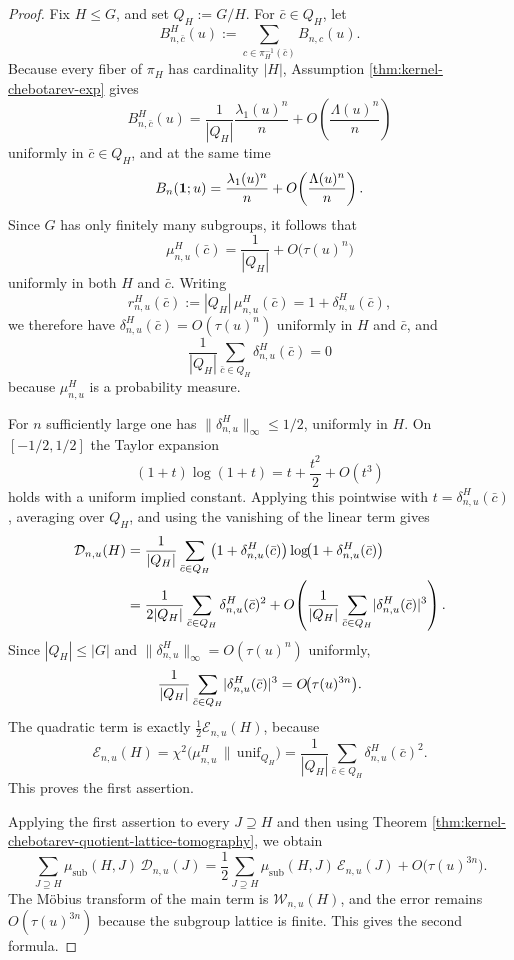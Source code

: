 \begin{proof}
Fix \(H\le G\), and set \(Q_H:=G/H\). For \(\bar c\in Q_H\), let
\[
B^{H}_{n,\bar c}(u):=\sum_{c\in \pi_H^{-1}(\bar c)}B_{n,c}(u).
\]
Because every fiber of \(\pi_H\) has cardinality \(|H|\), Assumption \ref{thm:kernel-chebotarev-exp} gives
\[
B^{H}_{n,\bar c}(u)
=
\frac{1}{|Q_H|}\frac{\lambda_1(u)^n}{n}
+
O\!\left(\frac{\Lambda(u)^n}{n}\right)
\]
uniformly in \(\bar c\in Q_H\), and at the same time
\[
B_n(\mathbf{1};u)
=
\frac{\lambda_1(u)^n}{n}
+
O\!\left(\frac{\Lambda(u)^n}{n}\right).
\]
Since \(G\) has only finitely many subgroups, it follows that
\[
\mu_{n,u}^H(\bar c)=\frac{1}{|Q_H|}+O\!\bigl(\tau(u)^n\bigr)
\]
uniformly in both \(H\) and \(\bar c\). Writing
\[
r_{n,u}^H(\bar c):=|Q_H|\,\mu_{n,u}^H(\bar c)=1+\delta_{n,u}^H(\bar c),
\]
we therefore have \(\delta_{n,u}^H(\bar c)=O(\tau(u)^n)\) uniformly in \(H\) and \(\bar c\), and
\[
\frac{1}{|Q_H|}\sum_{\bar c\in Q_H}\delta_{n,u}^H(\bar c)=0
\]
because \(\mu_{n,u}^H\) is a probability measure.

For \(n\) sufficiently large one has \(\|\delta_{n,u}^H\|_\infty\le 1/2\), uniformly in \(H\). On \([-1/2,1/2]\) the Taylor expansion
\[
(1+t)\log(1+t)=t+\frac{t^2}{2}+O(t^3)
\]
holds with a uniform implied constant. Applying this pointwise with \(t=\delta_{n,u}^H(\bar c)\), averaging over \(Q_H\), and using the vanishing of the linear term gives
\[
\begin{aligned}
\mathcal D_{n,u}(H)
&=
\frac{1}{|Q_H|}\sum_{\bar c\in Q_H}
\bigl(1+\delta_{n,u}^H(\bar c)\bigr)
\log\!\bigl(1+\delta_{n,u}^H(\bar c)\bigr)\\
&=
\frac{1}{2|Q_H|}\sum_{\bar c\in Q_H}\delta_{n,u}^H(\bar c)^2
+
O\!\left(\frac{1}{|Q_H|}\sum_{\bar c\in Q_H}\lvert \delta_{n,u}^H(\bar c)\rvert^3\right).
\end{aligned}
\]
Since \(|Q_H|\le |G|\) and \(\|\delta_{n,u}^H\|_\infty=O(\tau(u)^n)\) uniformly,
\[
\frac{1}{|Q_H|}\sum_{\bar c\in Q_H}\lvert \delta_{n,u}^H(\bar c)\rvert^3
=
O\!\bigl(\tau(u)^{3n}\bigr).
\]
The quadratic term is exactly \(\frac12\mathcal E_{n,u}(H)\), because
\[
\mathcal E_{n,u}(H)
=
\chi^2\!\bigl(\mu_{n,u}^H\,\|\,\mathrm{unif}_{Q_H}\bigr)
=
\frac{1}{|Q_H|}\sum_{\bar c\in Q_H}\delta_{n,u}^H(\bar c)^2.
\]
This proves the first assertion.

Applying the first assertion to every \(J\supseteq H\) and then using Theorem \ref{thm:kernel-chebotarev-quotient-lattice-tomography}, we obtain
\[
\sum_{J\supseteq H}\mu_{\mathrm{sub}}(H,J)\,\mathcal D_{n,u}(J)
=
\frac12
\sum_{J\supseteq H}\mu_{\mathrm{sub}}(H,J)\,\mathcal E_{n,u}(J)
+
O\!\bigl(\tau(u)^{3n}\bigr).
\]
The Möbius transform of the main term is \(\mathcal W_{n,u}(H)\), and the error remains \(O(\tau(u)^{3n})\) because the subgroup lattice is finite. This gives the second formula.
\end{proof}

\endinput
